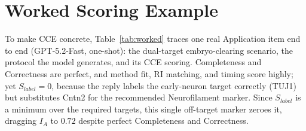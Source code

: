 \documentclass[conference]{IEEEtran}
\begin{document}
\section{Worked Scoring Example}\label{app:example}

To make CCE concrete, Table~\ref{tab:worked} traces one real Application
item end to end (GPT-5.2-Fast, one-shot): the dual-target
embryo-clearing scenario, the protocol the model generates, and its CCE
scoring. Completeness and Correctness are perfect, and method fit, RI
matching, and timing score highly; yet $S_{label}{=}0$, because the reply
labels the early-neuron target correctly (TUJ1) but substitutes Cntn2 for
the recommended Neurofilament marker. Since $S_{label}$ is a minimum over
the required targets, this single off-target marker zeroes it, dragging
$I_A$ to $0.72$ despite perfect Completeness and Correctness.
\end{document}
